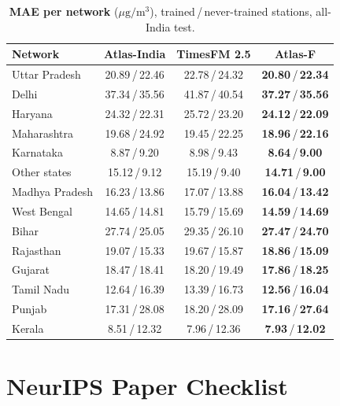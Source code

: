 \documentclass{article}
\newcommand{\pmu}{\ensuremath{\mu\mathrm{g/m^3}}}
\begin{document}
\begin{table}[h]
\caption{\textbf{MAE per network} (\pmu), trained\,/\,never-trained stations, all-India test.}
\label{tab:pernet}
\centering\small
\begin{tabular}{lccc}
\toprule
Network & Atlas-India & TimesFM 2.5 & Atlas-F \\
\midrule
Uttar Pradesh & 20.89\,/\,22.46 & 22.78\,/\,24.32 & \textbf{20.80}\,/\,\textbf{22.34} \\
Delhi & 37.34\,/\,35.56 & 41.87\,/\,40.54 & \textbf{37.27}\,/\,\textbf{35.56} \\
Haryana & 24.32\,/\,22.31 & 25.72\,/\,23.20 & \textbf{24.12}\,/\,\textbf{22.09} \\
Maharashtra & 19.68\,/\,24.92 & 19.45\,/\,22.25 & \textbf{18.96}\,/\,\textbf{22.16} \\
Karnataka & 8.87\,/\,9.20 & 8.98\,/\,9.43 & \textbf{8.64}\,/\,\textbf{9.00} \\
Other states & 15.12\,/\,9.12 & 15.19\,/\,9.40 & \textbf{14.71}\,/\,\textbf{9.00} \\
Madhya Pradesh & 16.23\,/\,13.86 & 17.07\,/\,13.88 & \textbf{16.04}\,/\,\textbf{13.42} \\
West Bengal & 14.65\,/\,14.81 & 15.79\,/\,15.69 & \textbf{14.59}\,/\,\textbf{14.69} \\
Bihar & 27.74\,/\,25.05 & 29.35\,/\,26.10 & \textbf{27.47}\,/\,\textbf{24.70} \\
Rajasthan & 19.07\,/\,15.33 & 19.67\,/\,15.87 & \textbf{18.86}\,/\,\textbf{15.09} \\
Gujarat & 18.47\,/\,18.41 & 18.20\,/\,19.49 & \textbf{17.86}\,/\,\textbf{18.25} \\
Tamil Nadu & 12.64\,/\,16.39 & 13.39\,/\,16.73 & \textbf{12.56}\,/\,\textbf{16.04} \\
Punjab & 17.31\,/\,28.08 & 18.20\,/\,28.09 & \textbf{17.16}\,/\,\textbf{27.64} \\
Kerala & 8.51\,/\,12.32 & 7.96\,/\,12.36 & \textbf{7.93}\,/\,\textbf{12.02} \\
\bottomrule
\end{tabular}
\end{table}

\newpage
\section*{NeurIPS Paper Checklist}
\end{document}
